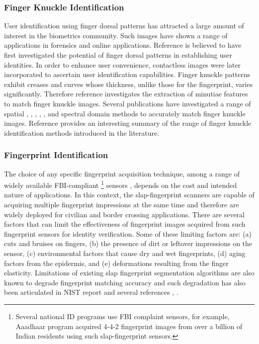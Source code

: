 \subsubsection{Finger Knuckle Identification\label{relate-work-fk}} 
User identification using finger dorsal patterns has attracted a large amount of interest in the biometrics community. Such images have shown a range of applications in forensics and online applications. Reference \cite{joshi1998computer} is believed to have first investigated the potential of finger dorsal patterns in establishing user identities. In order to enhance user convenience, contactless images were later incorporated to ascertain user identification capabilities. Finger knuckle patterns exhibit creases and curves whose thickness, unlike those for the fingerprint, varies significantly. Therefore reference \cite{kumar2015recovering} investigates the extraction of minutiae features to match finger knuckle images. Several publications have investigated a range of spatial \cite{woodard2005finger}, \cite{sricharan2006knuckle}, \cite{kumar2009personal}, \cite{zhang2010online}, \cite{zhu2010multimodal}, and spectral domain \cite{aoyama2011finger} methods to accurately match finger knuckle images. Reference \cite{jaswal2016knuckle} provides an interesting summary of the range of finger knuckle identification methods introduced in the literature. 

\subsubsection{Fingerprint Identification\label{realate-work-fp}}
The choice of any specific fingerprint acquisition technique, among a range of widely available FBI-compliant \footnote[1]{Several national ID programs use FBI complaint sensors, for example, Aaadhaar program acquired 4-4-2 fingerprint images from over a billion of Indian residents using such \cite{fbi-sensor} slap-fingerprint sensors.} sensors \cite{fbi-sensor}, depends on the cost and intended nature of applications. In this context, the slap-fingerprint scanners are capable of acquiring multiple fingerprint impressions at the same time and therefore are widely deployed for civilian and border crossing applications. There are several factors that can limit the effectiveness of ﬁngerprint images acquired from such fingerprint sensors for identity verification. Some of these limiting factors are: (a) cuts and bruises on ﬁngers, (b) the presence of dirt or leftover impressions on the sensor, (c) environmental factors that cause dry and wet fingerprints, (d) aging factors from the epidermis, and (e) deformations resulting from the finger elasticity. Limitations of existing slap fingerprint segmentation algorithms are also known to degrade fingerprint matching accuracy and such degradation has also been articulated in NIST report \cite{watson2009slapssegii} and several references \cite{maltoni2009handbook}, \cite{zhang2010slap}.

